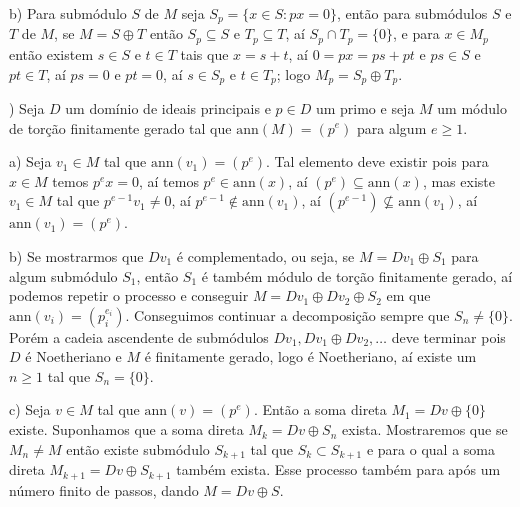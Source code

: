 \documentclass[10pt,a4paper]{article}
\begin{document}
\medskip
\noindent
b) Para submódulo $S$ de $M$ seja $S_p=\{x\in S:px=0\}$, então para submódulos $S$ e $T$ de $M$, se $M=S\oplus T$ então $S_p\subseteq S$ e $T_p\subseteq T$, aí $S_p\cap T_p=\{0\}$, e para $x\in M_p$ então existem $s\in S$ e $t\in T$ tais que $x=s+t$, aí $0=px=ps+pt$ e $ps\in S$ e $pt\in T$, aí $ps=0$ e $pt=0$, aí $s\in S_p$ e $t\in T_p$; logo $M_p=S_p\oplus T_p$.

\medskip
{}) Seja $D$ um domínio de ideais principais e $p\in D$ um primo e seja $M$ um módulo de torção finitamente gerado tal que $\mathrm{ann}(M)=(p^e)$ para algum $e\geq 1$.

\medskip
\noindent
a) Seja $v_1\in M$ tal que $\mathrm{ann}(v_1)=(p^e)$. Tal elemento deve existir pois para $x\in M$ temos $p^ex=0$, aí temos $p^e\in\mathrm{ann}(x)$, aí $(p^e)\subseteq\mathrm{ann}(x)$, mas existe $v_1\in M$ tal que $p^{e-1}v_1\neq 0$, aí $p^{e-1}\notin\mathrm{ann}(v_1)$, aí $(p^{e-1})\nsubseteq\mathrm{ann}(v_1)$, aí $\mathrm{ann}(v_1)=(p^e)$.

\medskip
\noindent
b) Se mostrarmos que $Dv_1$ é complementado, ou seja, se $M=Dv_1\oplus S_1$ para algum submódulo $S_1$, então $S_1$ é também módulo de torção finitamente gerado, aí podemos repetir o processo e conseguir $M=Dv_1\oplus Dv_2\oplus S_2$ em que $\mathrm{ann}(v_i)=(p_i^{e_i})$. Conseguimos continuar a decomposição sempre que $S_n\neq\{0\}$. Porém a cadeia ascendente de submódulos $Dv_1,Dv_1\oplus Dv_2,\dots$ deve terminar pois $D$ é Noetheriano e $M$ é finitamente gerado, logo é Noetheriano, aí existe um $n\geq 1$ tal que $S_n=\{0\}$.

\medskip
\noindent
c) Seja $v\in M$ tal que $\mathrm{ann}(v)=(p^e)$. Então a soma direta $M_1=Dv\oplus\{0\}$ existe. Suponhamos que a soma direta $M_k=Dv\oplus S_n$ exista. Mostraremos que se $M_n\neq M$ então existe submódulo $S_{k+1}$ tal que $S_k\subset S_{k+1}$ e para o qual a soma direta $M_{k+1}=Dv\oplus S_{k+1}$ também exista. Esse processo também para após um número finito de passos, dando $M=Dv\oplus S$.
\end{document}

